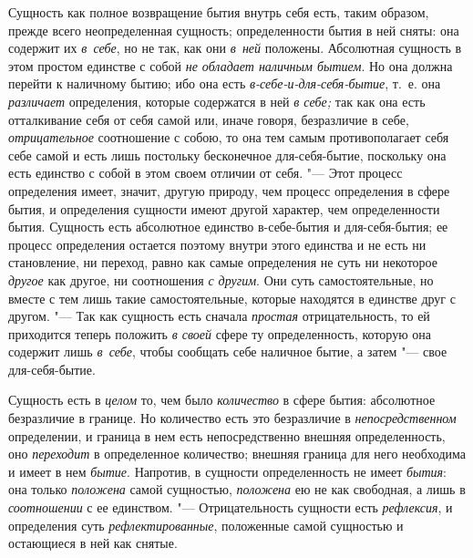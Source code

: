 Сущность как полное возвращение бытия внутрь себя есть, таким образом,
прежде всего неопределенная сущность; определенности бытия в ней сняты: она
содержит их {\em в~себе}, но не так, как они
{\em в~ней} положены. Абсолютная сущность в этом
простом единстве с собой {\em не обладает наличным
бытием}. Но она должна перейти к наличному бытию; ибо она есть
{\em в-себе-и-для-себя-бытие}, т.~е. она
{\em различает} определения, которые содержатся в ней
{\em в себе;} так как она есть отталкивание себя от
себя самой или, иначе говоря, безразличие в себе,
{\em отрицательное} соотношение с собою, то она тем
самым противополагает себя себе самой и есть лишь постольку бесконечное
для-себя-бытие, поскольку она есть единство с собой в этом своем отличии от
себя. "--- Этот процесс определения имеет, значит, другую природу, чем процесс
определения в сфере бытия, и определения сущности имеют другой характер,
чем определенности бытия. Сущность есть абсолютное единство в-себе-бытия и
для-себя-бытия; ее процесс определения остается поэтому внутри этого
единства и не есть ни становление, ни переход, равно как самые определения
не суть ни некоторое {\em другое} как другое, ни
соотношения {\em с другим}. Они суть самостоятельные,
но вместе с тем лишь такие самостоятельные, которые находятся в единстве
друг с другом. "--- Так как сущность есть сначала
{\em простая} отрицательность, то ей приходится теперь
положить {\em в своей} сфере ту определенность, которую
она содержит лишь {\em в~себе}, чтобы сообщать себе
наличное бытие, а затем "--- свое для-себя-бытие.

Сущность есть в {\em целом} то, чем было
{\em количество} в сфере бытия: абсолютное безразличие
в границе. Но количество есть это безразличие в
{\em непосредственном} определении, и граница в нем
есть непосредственно внешняя определенность, оно
{\em переходит} в определенное количество; внешняя
граница для него необходима и имеет в нем {\em бытие}.
Напротив, в сущности определенность не имеет
{\em бытия}: она только
{\em положена} самой сущностью,
{\em положена} ею не как свободная, а лишь в
{\em соотношении} с ее единством. "--- Отрицательность
сущности есть {\em рефлексия}, и определения суть
{\em рефлектированные}, положенные самой сущностью и
остающиеся в ней как снятые.


